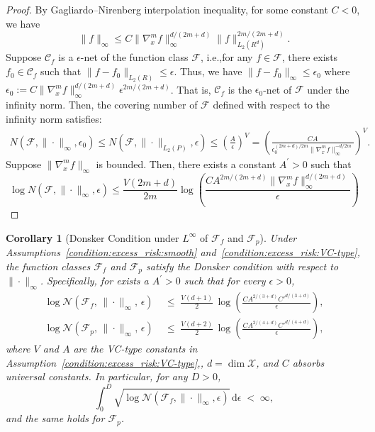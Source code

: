 \documentclass[12pt]{article}
\newtheorem{corollary}{Corollary}
\begin{document}
\begin{proof}
    By Gagliardo–Nirenberg interpolation inequality, for some constant $C<0$, we have 
    $$\|f\|_\infty\leq C \|\nabla_x^m f\|_\infty^{d/(2m+d)}\|f\|^{2m/(2m+d)}_{L_2(R^d)}.$$
    Suppose $\mathcal{C}_f$ is a $\epsilon$-net of the function class $\mathcal{F}$, i.e.,for any $f\in\mathcal{F}$, there exists $f_0\in\mathcal{C}_f$ such that $\|f-f_0\|_{L_2(R)}\leq \epsilon$. Thus, we have
    $\|f-f_0\|_{\infty}\leq \epsilon_0$ where $\epsilon_0:=C \|\nabla_x^m f\|_\infty^{d/(2m+d)}\epsilon^{2m/(2m+d)}$. That is, $\mathcal{C}_f$ is the $\epsilon_0$-net of $\mathcal{F}$ under the infinity norm. Then, the covering number of $\mathcal{F}$ defined with respect to the infinity norm satisfies:
    \begin{align*}
N(\mathcal{F},\|\cdot\|_\infty,\epsilon_0)
    \leq N(\mathcal{F},\|\cdot\|_{L_2(P)},\epsilon)
    \leq\left(\frac{A}{\epsilon}\right)^V = \left(\frac{CA}{\epsilon_0^{(2m+d)/2m}\|\nabla_x^m f\|_{\infty}^{-d/2m}}\right)^V.
    \end{align*}
Suppose $\|\nabla_x^m f\|_\infty$ is bounded. Then, there exists a constant $A^\prime>0$ such that
$$\log N(\mathcal{F},\|\cdot\|_\infty,\epsilon)\leq \frac{V(2m+d)}{2m}\log\left(\frac{C A^{2m/(2m+d)}\|\nabla_x^m f\|_{\infty}^{d/(2m+d)}}{\epsilon}\right)$$
\end{proof}


\begin{corollary}[Donsker Condition under $L^\infty$ of $\mathcal{F}_f$ and $\mathcal{F}_p$]\label{lemma:covering_number_Linfty}
Under Assumptions~\ref{condition:excess_risk:smooth} and~\ref{condition:excess_risk:VC-type}, the function classes $\mathcal{F}_f$ and $\mathcal{F}_p$ satisfy the Donsker condition with respect to $\|\cdot\|_\infty$. Specifically, for exists a $A^\prime>0$ such that for every $\epsilon > 0$,
\begin{align*}
\log\mathcal{N}(\mathcal{F}_f,\,\|\cdot\|_\infty,\,\epsilon)
&\;\leq\; \frac{V(d+1)}{2}\,\log\!\left(\frac{C A^{2/(3+d)}C'^{d/(3+d)}}{\epsilon}\right),\\
\log\mathcal{N}(\mathcal{F}_p,\,\|\cdot\|_\infty,\,\epsilon)
&\;\leq\; \frac{V(d+2)}{2}\,\log\!\left(\frac{C A^{2/(4+d)}C'^{d/(4+d)}}{\epsilon}\right),
\end{align*}
where $V$ and $A$ are the VC-type constants in Assumption~\ref{condition:excess_risk:VC-type},, $d=\dim\mathcal{X}$, and $C$ absorbs universal constants. In particular, for any $D>0$,
\[
\int_0^{D}\sqrt{\log\mathcal{N}(\mathcal{F}_f,\|\cdot\|_\infty,\epsilon)}\,\mathrm{d}\epsilon \;<\;\infty,
\]
and the same holds for $\mathcal{F}_p$.
\end{corollary}
\end{document}
